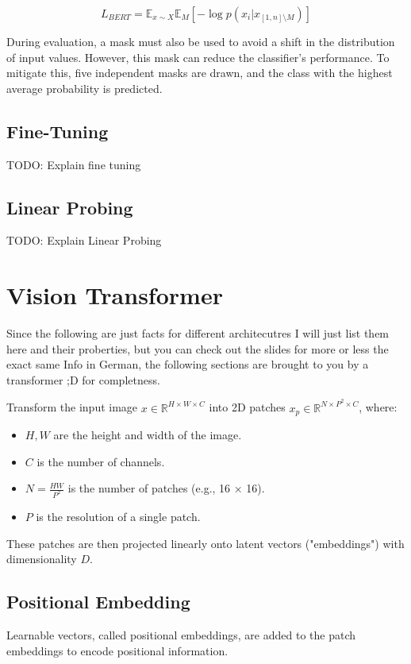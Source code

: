 \documentclass[a4paper]{article}
\begin{document}
\[
L_{BERT} = \mathbb{E}_{x \sim X} \mathbb{E}_{M} \left[ -\log p(x_i | x_{[1,n] \setminus M}) \right]
\]

During evaluation, a mask must also be used to avoid a shift in the distribution of input values. However, this mask can reduce the classifier's performance. To mitigate this, five independent masks are drawn, and the class with the highest average probability is predicted.

\subsection{Fine-Tuning}
TODO: Explain fine tuning
\subsection{Linear Probing}
TODO: Explain Linear Probing

\section{Vision Transformer}

Since the following are just facts for different architecutres I will just list them here and their proberties, but you can check out the slides for more or less the exact same Info in German, the following sections are brought to you by a transformer ;D for completness. 

Transform the input image \( x \in \mathbb{R}^{H \times W \times C} \) into 2D patches \( x_p \in \mathbb{R}^{N \times P^2 \times C} \), where:
\begin{itemize}
    \item \( H, W \) are the height and width of the image.
    \item \( C \) is the number of channels.
    \item \( N = \frac{HW}{P^2} \) is the number of patches (e.g., 16 × 16).
    \item \( P \) is the resolution of a single patch.
\end{itemize}
These patches are then projected linearly onto latent vectors ("embeddings") with dimensionality \( D \).

\subsection{Positional Embedding}

Learnable vectors, called positional embeddings, are added to the patch embeddings to encode positional information.
\end{document}
